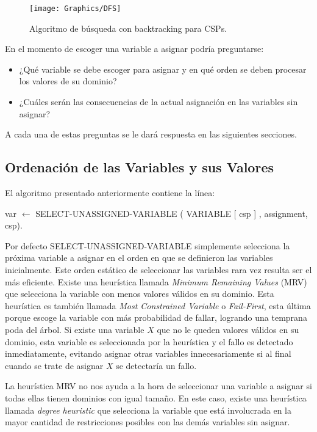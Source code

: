 \begin{figure}
	\begin{center}
		\texttt{[image: Graphics/DFS]}
		\caption{Algoritmo de b\'usqueda con backtracking para CSPs.}
		\label{DFS}
	\end{center}	
\end{figure}

En el momento de escoger una variable a asignar podr\'ia preguntarse:

\begin{itemize}
	\item ¿Qu\'e variable se debe escoger para asignar y en qu\'e orden se deben procesar los valores de su dominio?
	\item ¿Cu\'ales ser\'an las consecuencias de la actual asignaci\'on en las variables sin asignar?
\end{itemize}

A cada una de estas preguntas se le dar\'a respuesta en las siguientes secciones.

\subsection{Ordenaci\'on de las Variables y sus Valores}

El algoritmo presentado anteriormente contiene la línea:

\begin{center}
	\scriptsize var $\leftarrow$ SELECT-UNASSIGNED-VARIABLE ( VARIABLE [ csp ] , assignment, csp).
\end{center}

Por defecto SELECT-UNASSIGNED-VARIABLE simplemente selecciona la pr\'oxima variable a asignar en el orden en que se definieron las variables inicialmente. Este orden est\'atico de seleccionar las variables rara vez resulta ser el m\'as eficiente. Existe una heur\'istica llamada \emph{Minimum Remaining Values} (MRV) que selecciona la variable con menos valores v\'alidos en su dominio. Esta heur\'istica es tambi\'en llamada \emph{Most Constrained Variable} o \emph{Fail-First}, esta \'ultima porque escoge la variable con m\'as probabilidad de fallar, logrando una temprana poda del \'arbol. Si existe una variable $X$ que no le queden valores v\'alidos en su dominio, esta variable es seleccionada por la heur\'istica y el fallo es detectado inmediatamente, evitando asignar otras variables innecesariamente si al final cuando se trate de asignar $X$ se detectar\'ia un fallo.

La heur\'istica MRV no nos ayuda a la hora de seleccionar una variable a asignar si todas ellas tienen dominios con igual tamaño. En este caso, existe una heur\'istica llamada \emph{degree heuristic} que selecciona la variable que est\'a involucrada en la mayor cantidad de restricciones posibles con las dem\'as variables sin asignar.

